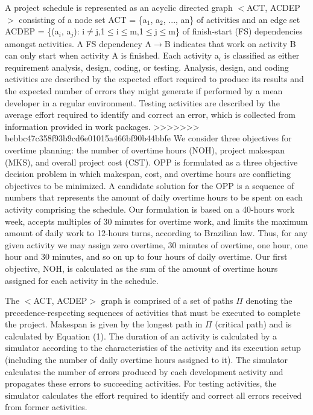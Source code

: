 \documentclass[conference]{IEEEtran}
\begin{document}
A project schedule is represented as an acyclic directed graph $<$ACT, ACDEP$>$ consisting of a node set ACT = \{a$_{1}$, a$_{2}$, ..., an\} of activities and an edge set ACDEP = \{(a$_{i}$, a$_{j}$): i$\not=$j,1$\leq$i$\leq$m,1$\leq$j$\leq$m\} of finish-start (FS) dependencies amongst activities. A FS dependency A$\rightarrow$B indicates that work on activity B can only start when activity A is finished. Each activity a$_{i}$ is classified as either requirement analysis, design, coding, or testing. Analysis, design, and coding activities are described by the expected effort required to produce its results and the expected number of errors they might generate if performed by a mean developer in a regular environment. Testing activities are described by the average effort required to identify and correct an error, which is collected from information provided in work packages.
>>>>>>> bebbc47c358f93b9cd6e01015a466bf90b44bbfe
We consider three objectives for overtime planning: the number of overtime hours (NOH), project makespan (MKS), and overall project cost (CST). OPP is formulated as a three objective decision problem in which makespan, cost, and overtime hours are conflicting objectives to be minimized. A candidate solution for the OPP is a sequence of numbers that represents the amount of daily overtime hours to be spent on each activity comprising the schedule. Our formulation is based on a 40-hours work week, accepts multiples of 30 minutes for overtime work, and limits the maximum amount of daily work to 12-hours turns, according to Brazilian law. Thus, for any given activity we may assign zero overtime, 30 minutes of overtime, one hour, one hour and 30 minutes, and so on up to four hours of daily overtime. Our first objective, NOH, is calculated as the sum of the amount of overtime hours assigned for each activity in the schedule.

The $<$ACT, ACDEP$>$ graph is comprised of a set of paths $\Pi$ denoting the precedence-respecting sequences of activities that must be executed to complete the project. Makespan is given by the longest path in $\Pi$ (critical path) and is calculated by Equation (1). The duration of an activity is calculated by a simulator according to the characteristics of the activity and its execution setup (including the number of daily overtime hours assigned to it). The simulator calculates the number of errors produced by each development activity and propagates these errors to succeeding activities. For testing activities, the simulator calculates the effort required to identify and correct all errors received from former activities.
\end{document}
